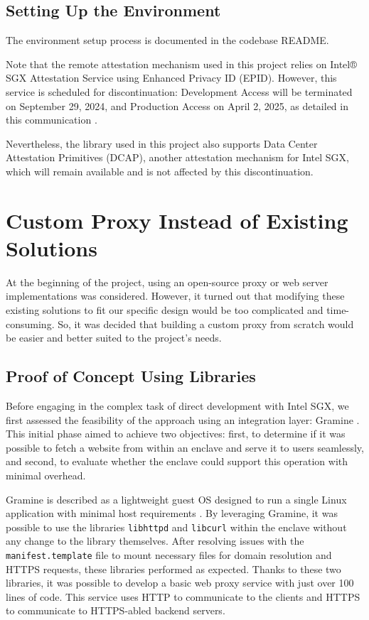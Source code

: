 \subsection{Setting Up the Environment}
The environment setup process is documented in the codebase README.

Note that the remote attestation mechanism used in this project relies on Intel® SGX Attestation Service using Enhanced Privacy ID (EPID)\cite{johnson2016intel}. However, this service is scheduled for discontinuation: Development Access will be terminated on September 29, 2024, and Production Access on April 2, 2025, as detailed in this communication \cite{intelSGX-IAS-EOL}. 

Nevertheless, the library used in this project also supports Data Center Attestation Primitives (DCAP)\cite{dcap}, another attestation mechanism for Intel SGX, which will remain available and is not affected by this discontinuation.

\section{Custom Proxy Instead of Existing Solutions}
At the beginning of the project, using an open-source proxy or web server implementations was considered. However, it turned out that modifying these existing solutions to fit our specific design would be too complicated and time-consuming. So, it was decided that building a custom proxy from scratch would be easier and better suited to the project's needs.

\subsection{Proof of Concept Using Libraries}
Before engaging in the complex task of direct development with Intel SGX, we first assessed the feasibility of the approach using an integration layer: Gramine \cite{gramine}. This initial phase aimed to achieve two objectives: first, to determine if it was possible to fetch a website from within an enclave and serve it to users seamlessly, and second, to evaluate whether the enclave could support this operation with minimal overhead.

Gramine is described as a lightweight guest OS designed to run a single Linux application with minimal host requirements \cite{gramine}. By leveraging Gramine, it was possible to use the libraries \texttt{libhttpd} and \texttt{libcurl} within the enclave without any change to the library themselves. After resolving issues with the \texttt{manifest.template} file to mount necessary files for domain resolution and HTTPS requests, these libraries performed as expected. Thanks to these two libraries, it was possible to develop a basic web proxy service with just over 100 lines of code. This service uses HTTP to communicate to the clients and HTTPS to communicate to HTTPS-abled backend servers. 

